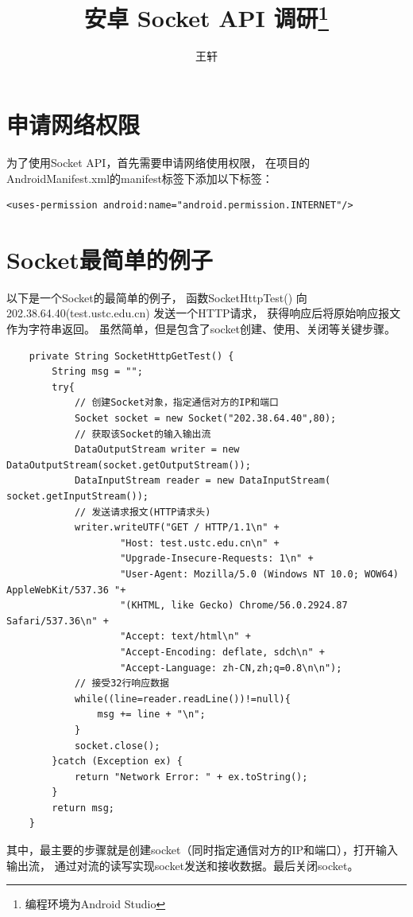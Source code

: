 \documentclass{article}
\title{安卓 Socket API 调研\footnote{编程环境为Android Studio} }
\author{王轩}
\begin{document}
\maketitle
\tableofcontents

\section{申请网络权限}
为了使用Socket API，首先需要申请网络使用权限，
在项目的AndroidManifest.xml的manifest标签下添加以下标签：
\begin{verbatim}
<uses-permission android:name="android.permission.INTERNET"/>
\end{verbatim}

\section{Socket最简单的例子}

以下是一个Socket的最简单的例子，
函数SocketHttpTest() 向202.38.64.40(test.ustc.edu.cn) 发送一个HTTP请求，
获得响应后将原始响应报文作为字符串返回。
虽然简单，但是包含了socket创建、使用、关闭等关键步骤。

\begin{verbatim}
    private String SocketHttpGetTest() {
        String msg = "";
        try{
            // 创建Socket对象，指定通信对方的IP和端口
            Socket socket = new Socket("202.38.64.40",80);
            // 获取该Socket的输入输出流
            DataOutputStream writer = new DataOutputStream(socket.getOutputStream());
            DataInputStream reader = new DataInputStream( socket.getInputStream());
            // 发送请求报文(HTTP请求头)
            writer.writeUTF("GET / HTTP/1.1\n" +
                    "Host: test.ustc.edu.cn\n" +
                    "Upgrade-Insecure-Requests: 1\n" +
                    "User-Agent: Mozilla/5.0 (Windows NT 10.0; WOW64) AppleWebKit/537.36 "+
                    "(KHTML, like Gecko) Chrome/56.0.2924.87 Safari/537.36\n" +
                    "Accept: text/html\n" +
                    "Accept-Encoding: deflate, sdch\n" +
                    "Accept-Language: zh-CN,zh;q=0.8\n\n");
            // 接受32行响应数据
            while((line=reader.readLine())!=null){
                msg += line + "\n";
            }
            socket.close();
        }catch (Exception ex) {
            return "Network Error: " + ex.toString();
        }
        return msg;
    }
\end{verbatim}

其中，最主要的步骤就是创建socket（同时指定通信对方的IP和端口），打开输入输出流，
通过对流的读写实现socket发送和接收数据。最后关闭socket。
\end{document}
